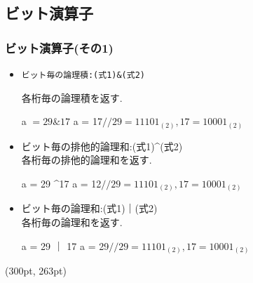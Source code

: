 \documentclass[dvipdfmx]{beamer}
\begin{document}
\subsection{ビット演算子}
\begin{frame}[t, fragile]
    \frametitle{ビット演算子(その1)}
    \begin{itemize}
        \item \begin{verbatim}ビット毎の論理積:(式1)&(式2)\end{verbatim}
            \qquad 各桁毎の論理積を返す.
            \begin{block}{a $= 29 \& 17$}
                a = 17\qquad $//29=11101_{(2)},17=10001_{(2)}$
            \end{block}
        \item ビット毎の排他的論理和:(式1)\textasciicircum(式2)\\
            \qquad 各桁毎の排他的論理和を返す.
            \begin{block}{a = 29 \textasciicircum 17}
                a = 12\qquad $//29=11101_{(2)},17=10001_{(2)}$
            \end{block}
        \item ビット毎の論理和:(式1)｜(式2)\\
            \qquad 各桁毎の論理和を返す.
            \begin{block}{a = 29 ｜ 17}
                a = 29\qquad $//29=11101_{(2)},17=10001_{(2)}$
            \end{block}
    \end{itemize}
    \begin{textblock*}{0.3\linewidth}(300pt, 263pt)
    \space
    \end{textblock*}
\end{frame}
\end{document}
